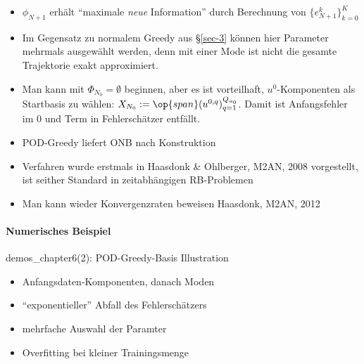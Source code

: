 \begin{bem} \beginwithlistbem
	\begin{itemize}
		\item $\phi_{N+1}$ erhält ``maximale \emph{neue} Information'' durch Berechnung von $\{e_{N+1}^k\}_{k=0}^K$
		\item Im Gegensatz zu normalem Greedy aus §\ref{sec-3} können hier Parameter mehrmals ausgewählt werden, denn mit einer Mode ist nicht die gesamte Trajektorie exakt approximiert.
		\item Man kann mit $\Phi_{N_0} = \emptyset$ beginnen, aber es ist vorteilhaft, $u^0$-Komponenten als Startbasis zu wählen: $X_{N_0} := \op{span}(u^{0,q})_{q=1}^{Q_{u_0}}$. Damit ist Anfangsfehler im $0$ und Term in Fehlerschätzer entfällt.
		\item POD-Greedy liefert ONB nach Konstruktion
		\item Verfahren wurde erstmals in Haasdonk \& Ohlberger, M2AN, 2008 vorgestellt, ist seither Standard in zeitabhängigen RB-Problemen
		\item Man kann wieder Konvergenzraten beweisen Haasdonk, M2AN, 2012
	\end{itemize}
\end{bem}

\paragraph*{Numerisches Beispiel} demos\_chapter6(2): POD-Greedy-Basis Illustration

\begin{itemize}
	\item Anfangsdaten-Komponenten, danach Moden
	\item ``exponentieller'' Abfall des Fehlerschätzers
	\item mehrfache Auswahl der Paramter
	\item Overfitting bei kleiner Trainingsmenge
\end{itemize}

